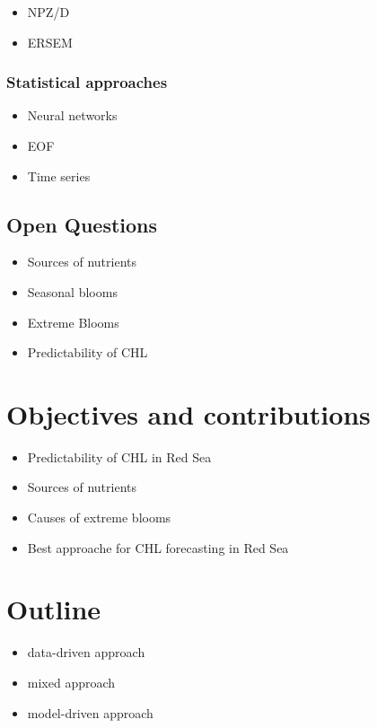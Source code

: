 			\begin{itemize}
				\item NPZ/D
				\item ERSEM
			\end{itemize}

		\subsubsection{Statistical approaches}

			\begin{itemize}
				\item Neural networks
				\item EOF
				\item Time series
			\end{itemize}

	\subsection{Open Questions}

		\begin{itemize}
			\item Sources of nutrients
			\item Seasonal blooms
			\item Extreme Blooms
			\item Predictability of CHL
		\end{itemize}

\section{Objectives and contributions}

	\begin{itemize}
		\item Predictability of CHL in Red Sea
		\item Sources of nutrients
		\item Causes of extreme blooms
		\item Best approache for CHL forecasting in Red Sea
	\end{itemize}

\section{Outline}

	\begin{itemize}
		\item data-driven approach
		\item mixed approach
		\item model-driven approach
	\end{itemize}
